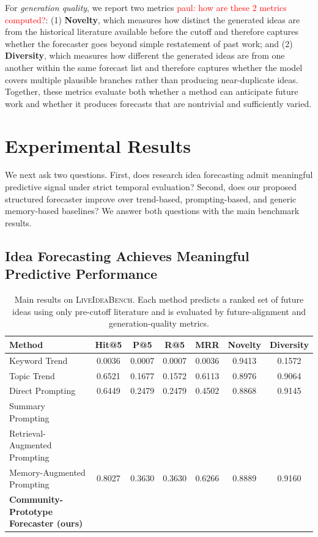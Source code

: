 \documentclass{article} %
\newcommand{\paul}[1]{\textcolor{red}{paul: #1}}
\begin{document}
For \emph{generation quality}, we report two metrics \paul{how are these 2 metrics computed?}: (1) \textbf{Novelty}, which measures how distinct the generated ideas are from the historical literature available before the cutoff and therefore captures whether the forecaster goes beyond simple restatement of past work; and (2) \textbf{Diversity}, which measures how different the generated ideas are from one another within the same forecast list and therefore captures whether the model covers multiple plausible branches rather than producing near-duplicate ideas. Together, these metrics evaluate both whether a method can anticipate future work and whether it produces forecasts that are nontrivial and sufficiently varied. 

\section{Experimental Results}

We next ask two questions. First, does research idea forecasting admit meaningful predictive signal under strict temporal evaluation? Second, does our proposed structured forecaster improve over trend-based, prompting-based, and generic memory-based baselines? We answer both questions with the main benchmark results.

\subsection{Idea Forecasting Achieves Meaningful Predictive Performance}

\begin{table}[t]
\centering
\small
\begin{tabular}{lcccccc}
\toprule
\textbf{Method} & \textbf{Hit@5} & \textbf{P@5} & \textbf{R@5} & \textbf{MRR} & \textbf{Novelty} & \textbf{Diversity} \\
\midrule
Keyword Trend & 0.0036 & 0.0007 & 0.0007 & 0.0036 & 0.9413 & 0.1572  \\
Topic Trend & 0.6521 & 0.1677 & 0.1572 & 0.6113 & 0.8976 & 0.9064  \\
Direct Prompting & 0.6449 & 0.2479 & 0.2479 & 0.4502 & 0.8868 & 0.9145 \\
Summary Prompting &  &  &  &  &  &  \\
Retrieval-Augmented Prompting &  &  &  &  &  &  \\
Memory-Augmented Prompting & 0.8027 & 0.3630 & 0.3630 & 0.6266 & 0.8889 & 0.9160  \\
\midrule
\textbf{Community-Prototype Forecaster (ours)} &  &  &  &  &  &  \\
\bottomrule
\end{tabular}
\caption{Main results on \textsc{LiveIdeaBench}. Each method predicts a ranked set of future ideas using only pre-cutoff literature and is evaluated by future-alignment and generation-quality metrics.}
\label{tab:main_results}
\end{table}
\end{document}
